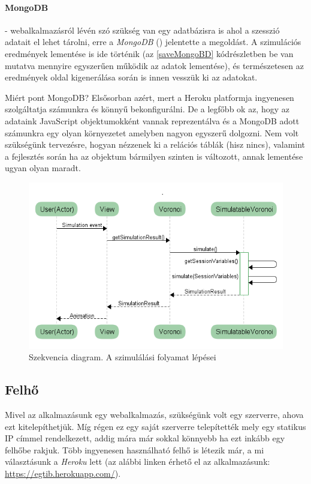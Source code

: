 \paragraph{MongoDB} - webalkalmazásról lévén szó szükség van egy adatbázisra is ahol a szesszió adatait el lehet tárolni, erre a \textit{MongoDB} (\cite{soft:mongodb}) jelentette a megoldást. A szimulációs eredmények lementése is ide történik (az \ref{saveMongoBD} kódrészletben be van mutatva mennyire egyszerűen működik az adatok lementése), és természetesen az eredmények oldal kigenerálása során is innen vesszük ki az adatokat.

Miért pont MongoDB? Elsősorban azért, mert a Heroku platformja ingyenesen szolgáltatja számunkra és könnyű bekonfigurálni. De a legfőbb ok az, hogy az adataink JavaScript objektumokként vannak reprezentálva és a MongoDB adott számunkra egy olyan környezetet amelyben nagyon egyszerű dolgozni. Nem volt szükségünk tervezésre, hogyan nézzenek ki a relációs táblák (hisz nincs), valamint a fejlesztés során ha az objektum bármilyen szinten is változott, annak lementése ugyan olyan maradt.

\begin{figure}[ht!]
	\centering
	\includegraphics[width=\linewidth]{images/SimulationProcess}
	\caption{Szekvencia diagram. A szimulálási folyamat lépései}
	\label{fig:SimulationProcess}
\end{figure}

\subsection{Felhő}

Mivel az alkalmazásunk egy webalkalmazás, szükségünk volt egy szerverre, ahova ezt kitelepíthetjük. Míg régen ez egy saját szerverre telepítették mely egy statikus IP címmel rendelkezett, addig mára már sokkal könnyebb ha ezt inkább egy felhőbe rakjuk. Több ingyenesen használható felhő is létezik már, a mi választásunk a \textit{Heroku} lett (az alábbi linken érhető el az alkalmazásunk: \url{https://egtib.herokuapp.com/}).

